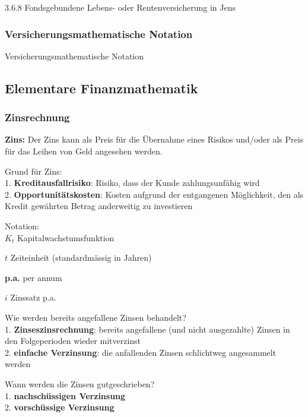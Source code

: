 \documentclass[
]{article}
\begin{document}
3.6.8 Fondsgebundene Lebens- oder Rentenversicherung in Jens

\hypertarget{versicherungsmathematische-notation}{%
\subsubsection{Versicherungsmathematische
Notation}\label{versicherungsmathematische-notation}}

Versicherungsmathematische Notation

\hypertarget{elementare-finanzmathematik}{%
\subsection{Elementare
Finanzmathematik}\label{elementare-finanzmathematik}}

\hypertarget{zinsrechnung}{%
\subsubsection{Zinsrechnung}\label{zinsrechnung}}

\textbf{Zins:} Der Zins kann als Preis für die Übernahme eines Risikos
und/oder als Preis für das Leihen von Geld angesehen werden.

Grund für Zins:\\
1. \textbf{Kreditausfallrisiko}: Risiko, dass der Kunde zahlungsunfähig
wird\\
2. \textbf{Opportunitätskosten}: Kosten aufgrund der entgangenen
Möglichkeit, den als Kredit gewährten Betrag anderweitig zu investieren

Notation:\\

\(K_t\) Kapitalwachstumsfunktion

\(t\) Zeiteinheit (standardmässig in Jahren)

\textbf{p.a.} per annum

\(i\) Zinssatz p.a.

Wie werden bereits angefallene Zinsen behandelt?\\
1. \textbf{Zinseszinsrechnung}: bereits angefallene (und nicht
ausgezahlte) Zinsen in den Folgeperioden wieder mitverzinst\\
2. \textbf{einfache Verzinsung}: die anfallenden Zinsen schlichtweg
angesammelt werden

Wann werden die Zinsen gutgeschrieben?\\
1. \textbf{nachschüssigen Verzinsung}\\
2. \textbf{vorschüssige Verzinsung}
\end{document}
